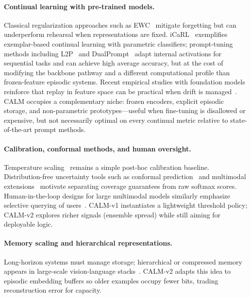 \documentclass{article}
\begin{document}
\paragraph{Continual learning with pre-trained models.}
Classical regularization approaches such as EWC~\citep{kirkpatrick2017ewc} mitigate forgetting but can underperform rehearsal when representations are fixed. iCaRL~\citep{rebuffi2017icarl} exemplifies exemplar-based continual learning with parametric classifiers; prompt-tuning methods including L2P~\citep{wang2022l2p} and DualPrompt~\citep{wang2022dualprompt} adapt internal activations for sequential tasks and can achieve high average accuracy, but at the cost of modifying the backbone pathway and a different computational profile than frozen-feature episodic systems. Recent empirical studies with foundation models reinforce that replay in feature space can be practical when drift is managed~\citep{hayes2024latentreplay}. CALM occupies a complementary niche: frozen encoders, explicit episodic storage, and non-parametric prototypes---useful when fine-tuning is disallowed or expensive, but not necessarily optimal on every continual metric relative to state-of-the-art prompt methods.

\paragraph{Calibration, conformal methods, and human oversight.}
Temperature scaling~\citep{guo2017calibration} remains a simple post-hoc calibration baseline. Distribution-free uncertainty tools such as conformal prediction~\citep{angelopoulos2021conformal} and multimodal extensions~\citep{chen2024conformalvlm} motivate separating coverage guarantees from raw softmax scores. Human-in-the-loop designs for large multimodal models similarly emphasize selective querying of users~\citep{zhang2024humanloop}. CALM-v1 instantiates a lightweight threshold policy; CALM-v2 explores richer signals (ensemble spread) while still aiming for deployable logic.

\paragraph{Memory scaling and hierarchical representations.}
Long-horizon systems must manage storage; hierarchical or compressed memory appears in large-scale vision-language stacks~\citep{deepseekocr2024,deepseekvl22024}. CALM-v2 adapts this idea to episodic embedding buffers so older examples occupy fewer bits, trading reconstruction error for capacity.
\end{document}
